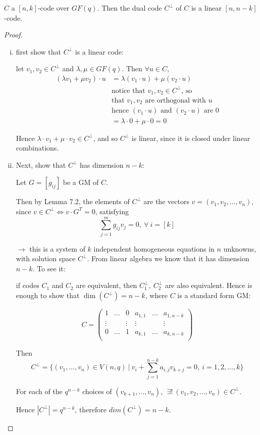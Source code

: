 \documentclass{article}
\theoremstyle{definition}
\newenvironment{thm}[1]
{\renewcommand\theinnerthm{#1}\innerthm}
{\endinnerthm}
\newcommand{\Vnq}{V(n, q)}
\begin{document}
\begin{thm}{7.3}
  $C$ a $[n,k]$-code over $GF(q)$. Then the dual code $C^\perp$ of $C$ is a linear $[n, n-k]$-code.
\end{thm}
\begin{proof}
  \begin{enumerate}[i.]
    \item first show that $C^\perp$ is a linear code:

      let $v_1,v_2 \in C^\perp$ and $\lambda, \mu \in GF(q)$. Then $\forall u \in C$,
      \begin{align*}
        (\lambda v_1 + \mu v_2) \cdot u &= \lambda (v_1 \cdot u) + \mu (v_2 \cdot u)\\
                                        &\text{notice that $v_1,v_2 \in C^\perp$, so}\\
                                        &\text{that $v_1,v_2$ are orthogonal with $u$}\\
                                        &\text{hence $(v_1 \cdot u)$ and $(v_2 \cdot u)$ are $0$}\\
                                        &= \lambda \cdot 0 + \mu \cdot 0 = 0
      \end{align*}

      Hence $\lambda \cdot v_1 + \mu \cdot v_2 \in C^\perp$, and so $C^\perp$ is linear, since it is closed under linear combinations.
      
    \item Next, show that $C^\perp$ has dimension $n-k$:

      Let $G=[g_{ij}]$ be a GM of $C$.

      Then by Lemma 7.2, the elements of $C^\perp$ are the vectors $v = (v_1, v_2, \dots, v_n)$, since $v \in C^\perp \Longleftrightarrow v \cdot G^T=0$, satisfying
      $$\sum_{j=1}^{m} g_{ij} v_j = 0, ~\forall~ i = [k]$$

      $\longrightarrow$ this is a system of $k$ independent homogeneous equations in $n$ unknowns, with solution space $C^\perp$. From linear algebra we know that it has dimension $n-k$. To see it:

      if codes $C_1$ and $C_2$ are equivalent, then $C_1^\perp,~ C_2^\perp$ are also equivalent. Hence is enough to show that $\dim(C^\perp) = n-k$, where $C$ is a standard form GM:

$$C = \begin{pmatrix}
  1 & \ldots & 0 & a_{1,1} & \ldots & a_{1, n-k} \\
  \vdots & & \vdots & \vdots & & \vdots \\
  0 & \ldots & 1 & a_{k,1} & \ldots & a_{k, n-k} \\
\end{pmatrix}$$

Then
$$C^\perp = \{ (v_1, \ldots, v_n) \in \Vnq ~\big|~ v_i + \sum_{j=1}^{n-k} a_{i,j} v_{k+j} = 0,~ i=1,2,\ldots,k \}$$

For each of the $q^{n-k}$ choices of $(v_{k+1}, \ldots, v_n),~~ \exists!~ (v_1, v_2, \ldots, v_n) \in C^\perp$.

Hence $|C^\perp| = q^{n-k}$, therefore $dim(C^\perp) = n-k$.
  \end{enumerate}
\end{proof}
\end{document}
